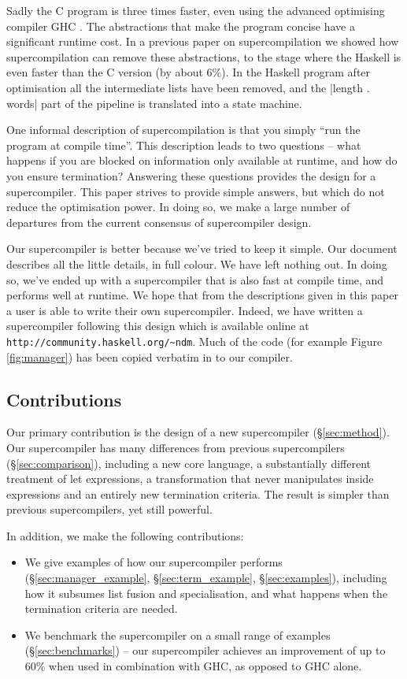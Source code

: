 \documentclass[draft]{sigplanconf}
\begin{document}
Sadly the C program is three times faster, even using the advanced optimising compiler GHC \cite{GHC}. The abstractions that make the program concise have a significant runtime cost. In a previous paper on supercompilation \cite{me:supero} we showed how supercompilation can remove these abstractions, to the stage where the Haskell is even faster than the C version (by about 6\%). In the Haskell program after optimisation all the intermediate lists have been removed, and the |length . words| part of the pipeline is translated into a state machine.

One informal description of supercompilation is that you simply ``run the program at compile time''. This description leads to two questions -- what happens if you are blocked on information only available at runtime, and how do you ensure termination? Answering these questions provides the design for a supercompiler. This paper strives to provide simple answers, but which do not reduce the optimisation power. In doing so, we make a large number of departures from the current consensus of supercompiler design.

Our supercompiler is better because we've tried to keep it simple. Our document describes all the little details, in full colour. We have left nothing out. In doing so, we've ended up with a supercompiler that is also fast at compile time, and performs well at runtime. We hope that from the descriptions given in this paper a user is able to write their own supercompiler. Indeed, we have written a supercompiler following this design which is available online at \verb"http://community.haskell.org/~ndm". Much of the code (for example Figure \ref{fig:manager}) has been copied verbatim in to our compiler.

\subsection{Contributions}

Our primary contribution is the design of a new supercompiler (\S\ref{sec:method}). Our supercompiler has many differences from previous supercompilers (\S\ref{sec:comparison}), including a new core language, a substantially different treatment of let expressions, a transformation that never manipulates inside expressions and an entirely new termination criteria. The result is simpler than previous supercompilers, yet still powerful.

In addition, we make the following contributions:

\begin{itemize}
\item We give examples of how our supercompiler performs (\S\ref{sec:manager_example}, \S\ref{sec:term_example}, \S\ref{sec:examples}), including how it subsumes list fusion and specialisation, and what happens when the termination criteria are needed.
\item We benchmark the supercompiler on a small range of examples (\S\ref{sec:benchmarks}) -- our supercompiler achieves an improvement of up to 60\% when used in combination with GHC, as opposed to GHC alone.
\end{itemize}
\end{document}
